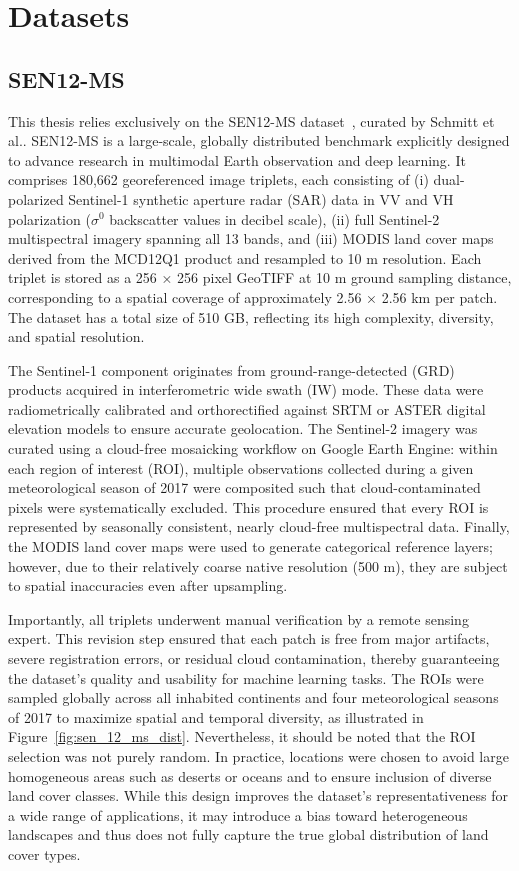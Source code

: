 \section{Datasets}
\label{sec:datasets}
\subsection{SEN12-MS}
This thesis relies exclusively on the SEN12-MS dataset~\cite{sen12ms_2019}, curated by Schmitt et al.. SEN12-MS is a large-scale, globally distributed benchmark explicitly designed to advance research in multimodal Earth observation and deep learning. It comprises 180,662 georeferenced image triplets, each consisting of (i) dual-polarized Sentinel-1 synthetic aperture radar (SAR) data in VV and VH polarization ($\sigma^{0}$ backscatter values in decibel scale), (ii) full Sentinel-2 multispectral imagery spanning all 13 bands, and (iii) MODIS land cover maps derived from the MCD12Q1 product and resampled to 10 m resolution. Each triplet is stored as a 256 × 256 pixel GeoTIFF at 10 m ground sampling distance, corresponding to a spatial coverage of approximately 2.56 × 2.56 km per patch. The dataset has a total size of 510 GB, reflecting its high complexity, diversity, and spatial resolution.

The Sentinel-1 component originates from ground-range-detected (GRD) products acquired in interferometric wide swath (IW) mode. These data were radiometrically calibrated and orthorectified against SRTM or ASTER digital elevation models to ensure accurate geolocation. The Sentinel-2 imagery was curated using a cloud-free mosaicking workflow on Google Earth Engine: within each region of interest (ROI), multiple observations collected during a given meteorological season of 2017 were composited such that cloud-contaminated pixels were systematically excluded. This procedure ensured that every ROI is represented by seasonally consistent, nearly cloud-free multispectral data. Finally, the MODIS land cover maps were used to generate categorical reference layers; however, due to their relatively coarse native resolution (500 m), they are subject to spatial inaccuracies even after upsampling.

Importantly, all triplets underwent manual verification by a remote sensing expert. This revision step ensured that each patch is free from major artifacts, severe registration errors, or residual cloud contamination, thereby guaranteeing the dataset’s quality and usability for machine learning tasks.
The ROIs were sampled globally across all inhabited continents and four meteorological seasons of 2017 to maximize spatial and temporal diversity, as illustrated in Figure~\ref{fig:sen_12_ms_dist}. Nevertheless, it should be noted that the ROI selection was not purely random. In practice, locations were chosen to avoid large homogeneous areas such as deserts or oceans and to ensure inclusion of diverse land cover classes. While this design improves the dataset’s representativeness for a wide range of applications, it may introduce a bias toward heterogeneous landscapes and thus does not fully capture the true global distribution of land cover types.

